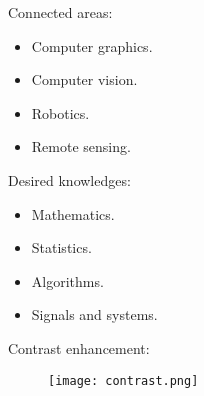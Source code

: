 %
%


\begin{frame}
Connected areas:
\begin{itemize}
\item Computer graphics.
\item Computer vision.
\item Robotics.
\item Remote sensing.
\end{itemize}
\end{frame}


\begin{frame}
Desired knowledges:
\begin{itemize}
\item Mathematics.
\item Statistics.
\item Algorithms.
\item Signals and systems.
\end{itemize}
\end{frame}


\begin{frame}
Contrast enhancement:
\begin{figure}
\centering
\texttt{[image: contrast.png]}
\end{figure}
\end{frame}


